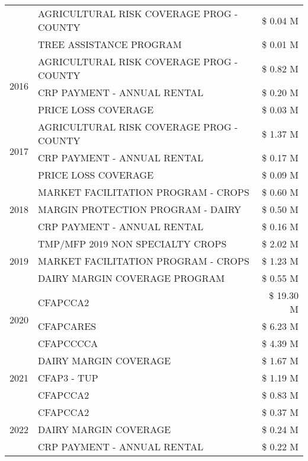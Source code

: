 \begin{tabular}{llr}
 & AGRICULTURAL RISK COVERAGE PROG - COUNTY & \$ 0.04 M \\
 & TREE ASSISTANCE PROGRAM & \$ 0.01 M \\
\cline{1-3}
\multirow[t]{3}{*}{2016} & AGRICULTURAL RISK COVERAGE PROG - COUNTY & \$ 0.82 M \\
 & CRP PAYMENT - ANNUAL RENTAL & \$ 0.20 M \\
 & PRICE LOSS COVERAGE & \$ 0.03 M \\
\cline{1-3}
\multirow[t]{3}{*}{2017} & AGRICULTURAL RISK COVERAGE PROG - COUNTY & \$ 1.37 M \\
 & CRP PAYMENT - ANNUAL RENTAL & \$ 0.17 M \\
 & PRICE LOSS COVERAGE & \$ 0.09 M \\
\cline{1-3}
\multirow[t]{3}{*}{2018} & MARKET FACILITATION PROGRAM - CROPS & \$ 0.60 M \\
 & MARGIN PROTECTION PROGRAM - DAIRY & \$ 0.50 M \\
 & CRP PAYMENT - ANNUAL RENTAL & \$ 0.16 M \\
\cline{1-3}
\multirow[t]{3}{*}{2019} & TMP/MFP 2019 NON SPECIALTY CROPS & \$ 2.02 M \\
 & MARKET FACILITATION PROGRAM - CROPS & \$ 1.23 M \\
 & DAIRY MARGIN COVERAGE PROGRAM & \$ 0.55 M \\
\cline{1-3}
\multirow[t]{3}{*}{2020} & CFAPCCA2 & \$ 19.30 M \\
 & CFAPCARES & \$ 6.23 M \\
 & CFAPCCCCA & \$ 4.39 M \\
\cline{1-3}
\multirow[t]{3}{*}{2021} & DAIRY MARGIN COVERAGE & \$ 1.67 M \\
 & CFAP3 - TUP & \$ 1.19 M \\
 & CFAPCCA2 & \$ 0.83 M \\
\cline{1-3}
\multirow[t]{3}{*}{2022} & CFAPCCA2 & \$ 0.37 M \\
 & DAIRY MARGIN COVERAGE & \$ 0.24 M \\
 & CRP PAYMENT - ANNUAL RENTAL & \$ 0.22 M \\
\cline{1-3}
\bottomrule
\end{tabular}
